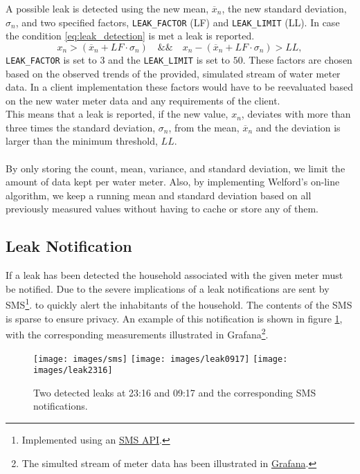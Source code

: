 A possible leak is detected using the new mean, $\overline{x}_n$, the new standard deviation, $\sigma_n$, and two specified factors, \verb|LEAK_FACTOR| (LF) and \verb|LEAK_LIMIT| (LL). In case the condition \ref{eq:leak_detection} is met a leak is reported.
\[
x_n > (\overline{x}_n + LF \cdot \sigma_n) \quad \&\& \quad
x_n - (\overline{x}_n + LF \cdot \sigma_n) > LL,
\tag{4.4}
\label{eq:leak_detection}
\]
\verb|LEAK_FACTOR| is set to $3$ and the \verb|LEAK_LIMIT| is set to $50$. These factors are chosen based on the observed trends of the provided, simulated stream of water meter data. In a client implementation these factors would have to be reevaluated based on the new water meter data and any requirements of the client.\\
This means that a leak is reported, if the new value, $x_n$, deviates with more than three times the standard deviation, $\sigma_n$, from the mean, $\overline{x}_n$ and the deviation is larger than the minimum threshold, $LL$.\\\\
By only storing the count, mean, variance, and standard deviation, we limit the amount of data kept per water meter. Also, by implementing Welford's on-line algorithm, we keep a running mean and standard deviation based on all previously measured values without having to cache or store any of them.\\
\subsection{Leak Notification}
\label{sec:not}
If a leak has been detected the household associated with the given meter must be notified. Due to the severe implications of a leak notifications are sent by SMS\footnote{Implemented using an \href{https://www.smsapi.com/docs/\#1-introduction}{SMS API}.}. to quickly alert the inhabitants of the household. The contents of the SMS is sparse to ensure privacy. An example of this notification is shown in figure \ref{fig:sms-notification}, with the corresponding measurements illustrated in Grafana\footnote{The simulted stream of meter data has been illustrated in \href{http://130.226.140.2:3000/d/1V60Yo_mz/watermeters-simulations?orgId=1&from=now-24h&to=now}{Grafana}.}.
\begin{figure}[H]\label{fig:sms-notification}
	\centering
	\texttt{[image: images/sms]}
	\texttt{[image: images/leak0917]} \texttt{[image: images/leak2316]}
	\caption{Two detected leaks at 23:16 and 09:17 and the corresponding SMS notifications.}
\end{figure}

